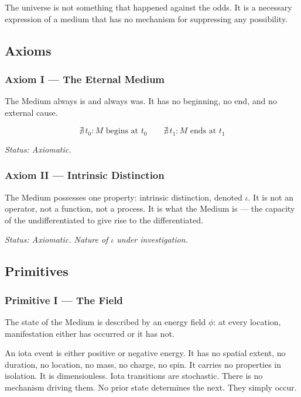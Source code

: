 \documentclass[11pt,letterpaper]{article}
\begin{document}
The universe is not something that happened against the odds. It is a necessary expression of a medium that has no mechanism for suppressing any possibility.
\subsection{Axioms}
\label{sec:orgc6a7f1d}

\subsubsection{Axiom I --- The Eternal Medium}
\label{sec:orgb90d4e4}

The Medium always is and always was. It has no beginning, no end, and no external cause.

\begin{equation}
\nexists\, t_0 : M \text{ begins at } t_0 \qquad \nexists\, t_1 : M \text{ ends at } t_1
\end{equation}

\emph{Status: Axiomatic.}
\subsubsection{Axiom II --- Intrinsic Distinction}
\label{sec:org0423a50}

The Medium possesses one property: intrinsic distinction, denoted \(\iota\). It is not an operator, not a function, not a process. It is what the Medium is --- the capacity of the undifferentiated to give rise to the differentiated.

\emph{Status: Axiomatic. Nature of \(\iota\) under investigation.}
\subsection{Primitives}
\label{sec:orge78b4e8}

\subsubsection{Primitive I --- The Field}
\label{sec:org6cfeb60}

The state of the Medium is described by an energy field \(\phi\): at every location, manifestation either has occurred or it has not.

An iota event is either positive or negative energy. It has no spatial extent, no duration, no location, no mass, no charge, no spin. It carries no properties in isolation. It is dimensionless.
Iota transitions are stochastic. There is no mechanism driving them. No prior state determines the next. They simply occur.
\end{document}
